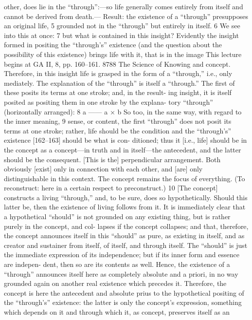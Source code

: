 other, does lie in the “through”:—so life generally comes entirely from itself
and cannot be derived from death.—
Result: the existence of a “through” presupposes an original life, 5
grounded not in the “through” but entirely in itself. 6
We see into this at once: 7 but what is contained in this insight? Evidently
the insight formed in positing the “through’s” existence (and the question
about the possibility of this existence) brings life with it, that is in the image
This lecture begins at GA II, 8, pp. 160–161.
8788
The Science of Knowing
and concept. Therefore, in this insight life is grasped in the form of a
“through,” i.e., only mediately. The explanation of the “through” is itself a
“through.” The first of these posits its terms at one stroke; and, in the result-
ing insight, it is itself posited as positing them in one stroke by the explana-
tory “through” (horizontally arranged): 8
a
——
a × b
So too, in the same way, with regard to the inner meaning, 9 sense, or content,
the first “through” does not posit its terms at one stroke; rather, life should be
the condition and the “through’s” existence [162–163] should be what is con-
ditioned; thus it [i.e., life] should be in the concept as a concept—in truth and
in itself—the antecedent, and the latter should be the consequent. [This is
the] perpendicular arrangement. Both obviously [exist] only in connection with
each other, and [are] only distinguishable in this context.
The concept remains the focus of everything. (To reconstruct: here in a
certain respect to preconstruct.) 10 [The concept] constructs a living “through,”
and, to be sure, does so hypothetically. Should this latter be, then the existence
of living follows from it. It is immediately clear that a hypothetical “should” is
not grounded on any existing thing, but is rather purely in the concept, and col-
lapses if the concept collapses; and that, therefore, the concept announces
itself in this “should” as pure, as existing in itself, and as creator and sustainer
from itself, of itself, and through itself. The “should” is just the immediate
expression of its independence; but if its inner form and essence are indepen-
dent, then so are its contents as well. Hence, the existence of a “through”
announces itself here as completely absolute and a priori, in no way grounded
again on another real existence which precedes it. Therefore, the concept is
here the antecedent and absolute prius to the hypothetical positing of the
“through’s” existence: the latter is only the concept’s expression, something
which depends on it and through which it, as concept, preserves itself as an
